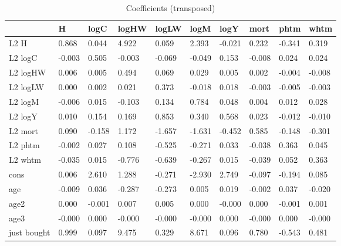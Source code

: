 \begin{table}[htbp]
\caption{\label{clabel} Coefficients (transposed)}\centering\medskip
\begin{tabular}{llllllllll} \hline \hline
 & H  & logC  & logHW  & logLW  & logM  & logY  & mort  & phtm  & whtm  \\  \hline 
L2 H &     0.868 &     0.044 &     4.922 &     0.059 &     2.393 &    -0.021 &     0.232 &    -0.341 &     0.319 \\  
L2 logC &    -0.003 &     0.505 &    -0.003 &    -0.069 &    -0.049 &     0.153 &    -0.008 &     0.024 &     0.024 \\  
L2 logHW &     0.006 &     0.005 &     0.494 &     0.069 &     0.029 &     0.005 &     0.002 &    -0.004 &    -0.008 \\  
L2 logLW &     0.000 &     0.002 &     0.021 &     0.373 &    -0.018 &     0.018 &    -0.003 &    -0.005 &    -0.003 \\  
L2 logM &    -0.006 &     0.015 &    -0.103 &     0.134 &     0.784 &     0.048 &     0.004 &     0.012 &     0.028 \\  
L2 logY &     0.010 &     0.154 &     0.169 &     0.853 &     0.340 &     0.568 &     0.023 &    -0.012 &    -0.010 \\  
L2 mort &     0.090 &    -0.158 &     1.172 &    -1.657 &    -1.631 &    -0.452 &     0.585 &    -0.148 &    -0.301 \\  
L2 phtm &    -0.002 &     0.027 &     0.108 &    -0.525 &    -0.271 &     0.033 &    -0.038 &     0.363 &     0.045 \\  
L2 whtm &    -0.035 &     0.015 &    -0.776 &    -0.639 &    -0.267 &     0.015 &    -0.039 &     0.052 &     0.363 \\  
cons &     0.006 &     2.610 &     1.288 &    -0.271 &    -2.930 &     2.749 &    -0.097 &    -0.194 &     0.085 \\  
age &    -0.009 &     0.036 &    -0.287 &    -0.273 &     0.005 &     0.019 &    -0.002 &     0.037 &    -0.020 \\  
age2 &     0.000 &    -0.001 &     0.007 &     0.005 &     0.000 &    -0.000 &     0.000 &    -0.001 &     0.001 \\  
age3 &    -0.000 &     0.000 &    -0.000 &    -0.000 &    -0.000 &     0.000 &    -0.000 &     0.000 &    -0.000 \\  
just bought &     0.999 &     0.097 &     9.475 &     0.329 &     8.671 &     0.096 &     0.780 &    -0.543 &     0.481 \\  
\hline \hline \end{tabular}
\end{table}

